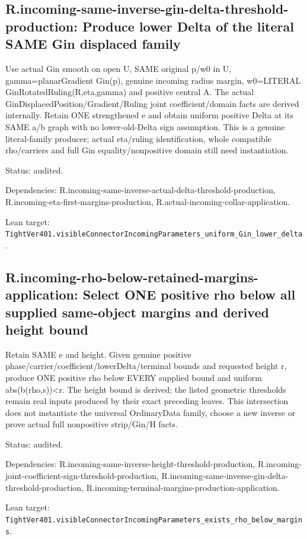 \documentclass{article}
\begin{document}
\subsection*{R.incoming-same-inverse-gin-delta-threshold-production: Produce lower Delta of the literal SAME Gin displaced family}
Use actual Gin smooth on open U, SAME original p/w0 in U, gamma=planarGradient Gin(p), genuine incoming radius margin, w0=LITERAL GinRotatedRuling(R,eta,gamma) and positive central A. The actual GinDisplacedPosition/Gradient/Ruling joint coefficient/domain facts are derived internally. Retain ONE strengthened e and obtain uniform positive Delta at its SAME a/b graph with no lower-old-Delta sign assumption. This is a genuine literal-family producer; actual eta/ruling identification, whole compatible rho/carriers and full Gin equality/nonpositive domain still need instantiation.
\par Status: audited.
\par Dependencies: R.incoming-same-inverse-actual-delta-threshold-production, R.incoming-eta-first-margins-production, R.actual-incoming-collar-application.
\par Lean target: \texttt{TightVer401.visibleConnectorIncomingParameters\_uniform\_Gin\_lower\_delta}.
\subsection*{R.incoming-rho-below-retained-margins-application: Select ONE positive rho below all supplied same-object margins and derived height bound}
Retain SAME e and height. Given genuine positive phase/carrier/coefficient/lowerDelta/terminal bounds and requested height r, produce ONE positive rho below EVERY supplied bound and uniform abs(b(rho,s))<r. The height bound is derived; the listed geometric thresholds remain real inputs produced by their exact preceding leaves. This intersection does not instantiate the universal OrdinaryData family, choose a new inverse or prove actual full nonpositive strip/Gin/H facts.
\par Status: audited.
\par Dependencies: R.incoming-same-inverse-height-threshold-production, R.incoming-joint-coefficient-sign-threshold-production, R.incoming-same-inverse-gin-delta-threshold-production, R.incoming-terminal-margins-production-application.
\par Lean target: \texttt{TightVer401.visibleConnectorIncomingParameters\_exists\_rho\_below\_margins}.
\end{document}

